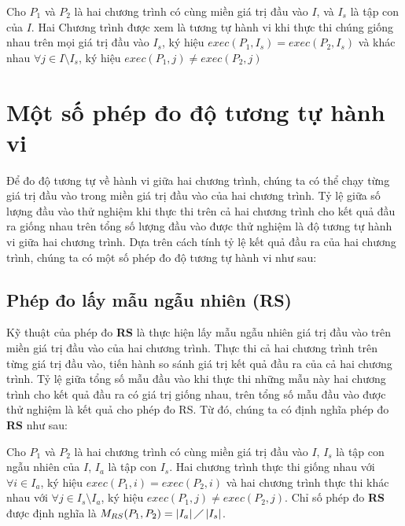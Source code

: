 \begin{definition}
Cho $P_{1}$ và $P_{2}$ là hai chương trình có cùng miền giá trị đầu vào $I$, và $I_{s}$ là tập con của $I$. Hai Chương trình được xem là tương tự hành vi khi thực thi chúng giống nhau trên mọi giá trị đầu vào $I_{s}$, ký hiệu  $exec(P_{1}, I_{s}) = exec(P_{2}, I_{s})$ và khác nhau $\forall j \in I \setminus I_{s}$, ký hiệu $exec(P_{1}, j) \neq exec(P_{2}, j)$
\end{definition}

\section{Một số phép đo độ tương tự hành vi}
\label{sec:metrics}

Để đo độ tương tự về hành vi giữa hai chương trình, chúng ta có thể chạy từng giá trị đầu vào trong miền giá trị đầu vào của hai chương trình. Tỷ lệ giữa số lượng đầu vào thử nghiệm khi thực thi trên cả hai chương trình cho kết quả đầu ra giống nhau trên tổng số lượng đầu vào được thử nghiệm là độ tương tự hành vi giữa hai chương trình. Dựa trên cách tính tỷ lệ kết quả đầu ra của hai chương trình, chúng ta có một số phép đo độ tương tự hành vi như sau:

\subsection{Phép đo lấy mẫu ngẫu nhiên (RS)}
Kỹ thuật của phép đo \textbf{RS} là thực hiện lấy mẫu ngẫu nhiên giá trị đầu vào trên miền giá trị đầu vào của hai chương trình. Thực thi cả hai chương trình trên từng giá trị đầu vào, tiến hành so sánh giá trị kết quả đầu ra của cả hai chương trình. Tỷ lệ giữa tổng số mẫu đầu vào khi thực thi những mẫu này hai chương trình cho kết quả đầu ra có giá trị giống nhau, trên tổng số mẫu đầu vào được thử nghiệm là kết quả cho phép đo RS. Từ đó, chúng ta có định nghĩa phép đo \textbf{RS} như sau:

\begin{definition}[Phép đo RS]
	Cho $P_{1}$ và $P_{2}$ là hai chương trình có cùng miền giá trị đầu vào $I$, $I_{s}$ là tập con ngẫu nhiên của $I$, $I_{a}$ là tập con $I_{s}$. Hai chương trình thực thi giống nhau với $\forall i \in I_{a}$, ký hiệu $exec(P_{1}, i) = exec(P_{2}, i)$ và hai chương trình thực thi khác nhau với $\forall j \in I_{s} \setminus I_{a}$, ký hiệu $exec(P_{1}, j) \neq exec(P_{2}, j)$. Chỉ số phép đo \textbf{RS} được định nghĩa là $M_{RS}(P_{1}, P_{2}) = \left|I_{a}\right| \diagup \left|I_{s}\right| $.
\end{definition}

